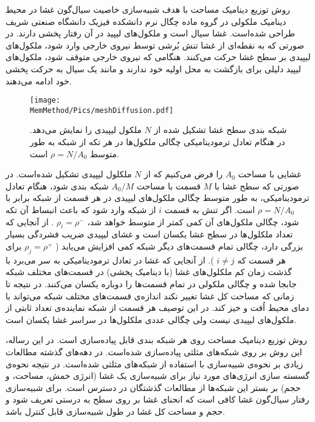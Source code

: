 روش توزیع دینامیک مساحت 
با هدف  شبیه‌سازی خاصیت سیال‌گون غشا در محیط دینامیک ملکولی در گروه ماده چگال نرم دانشکده فیزیک دانشگاه صنعتی شریف طراحی شده‌است.  غشا سیال است و ملکول‌های لیپید در آن رفتار پخشی دارند. در صورتی که به نقطه‌ای از غشا تنش بُرشی توسط نیروی خارجی وارد شود، ملکول‌های لیپیدی بر سطح غشا حرکت می‌کنند. هنگامی که نیروی‌ خارجی متوقف شود، ملکول‌های لیپید دلیلی برای بازگشت به محل اولیه خود ندارند و مانند یک سیال به حرکت پخشی خود ادامه می‌دهند. 

\begin{figure}[h]
\begin{center}
\texttt{[image: \\MemMethod/Pics/meshDiffusion.pdf]}
\caption{
شبکه بندی سطح غشا تشکیل شده از 
$N$
ملکول لیپیدی را نمایش می‌دهد. در هنگام تعادل ترمودینامیکی چگالی ملکول‌ها در هر تکه از شبکه به طور متوسط
$\rho=N/A_0$
است.
}
\label{fig:cylindermesh}
\end{center}
\end{figure}

غشایی با مساحت 
$A_0$
را فرض می‌کنیم که از 
$N$
ملکلول لیپیدی تشکیل شده‌است. در صورتی که سطح غشا با 
$M$
قسمت با مساحت 
$A_0/M$
شبکه بندی شود، هنگام  تعادل ترمودینامیکی، به طور متوسط چگالی ملکول‌های لیپیدی در هر قسمت از شبکه برابر با 
$\rho=N/A_0$
است. اگر تنش  به قسمت
$i$
از شبکه وارد شود که باعث انبساط آن تکه شود، چگالی ملکول‌های آن کمی کمتر از متوسط خواهد شد،
$\rho_i=\rho^-$
. از آنجایی که تعداد ملکلو‌ل‌ها در سطح غشا یکسان است و غشای لیپیدی ضریب فشردگی بسیار بزرگی دارد، چگالی تمام قسمت‌های دیگر شبکه کمی افزایش می‌یابد (
$\rho_j=\rho^+$
برای هر قسمت که
$i\neq j$
). از آنجایی که غشا در تعادل ترمودینامیکی به سر می‌برد با گذشت زمان کم ملکلول‌های غشا (با دینامیک پخشی) در قسمت‌های مختلف شبکه جابجا شده و چگالی ملکولی در تمام قسمت‌ها را دوباره یکسان می‌کنند. در نتیجه تا زمانی که مساحت کل غشا تغییر نکند اندازه‌ی قسمت‌های مختلف شبکه می‌تواند با دمای محیط اُفت  و خیز کند. در این توصیف هر قسمت از شبکه نماینده‌ی تعداد ثابتی از ملکول‌های لیپیدی نیست ولی چگالی عددی ملکلول‌ها در سراسر غشا یکسان است.

روش توزیع دینامیک مساحت روی هر شبکه‌ بندی قابل پیاده‌سازی است. در این رساله، این روش بر روی شبکه‌های مثلثی پیاده‌سازی شده‌است. در دهه‌های گذشته مطالعات زیادی بر نحوه‌ی شبیه‌سازی با استفاده از شبکه‌های مثلثی شده‌است. در نتیجه نحوه‌ی گسسته سازی انرژی‌های مورد نیاز برای شبیه‌سازی یک غشا (انرژی خمش، مساحت، و حجم) بر بستر این شبکه‌ها از مطالعات گذشتگان در دسترس است. برای شبیه‌سازی رفتار سیال‌گون غشا کافی ‌است که انحنای غشا بر روی سطح به درستی تعریف شود و حجم و مساحت کل غشا در طول شبیه‌سازی قابل کنترل باشد. 

